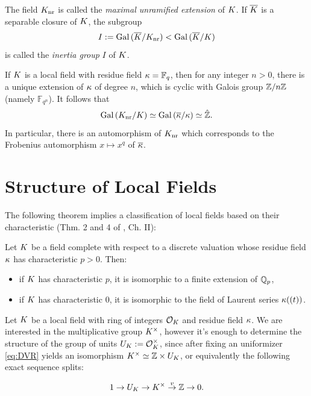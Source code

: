 \documentclass[a4paper, oneside]{memoir}
\begin{document}
The field $K_{\text{nr}}$ is called the \textit{maximal unramified extension} of $K$. If $\overline{K}$ is a separable closure of $K$, the subgroup
\[
    I:=\operatorname{Gal}{(\overline{K}/K_{\text{nr}})} < \operatorname{Gal}{(\overline{K}/K)}
\]
is called the \textit{inertia group} $I$ of $K$.

\begin{example}\label{ex:FinFields}
    If $K$ is a local field with residue field $\kappa=\mathbb{F}_q$, then for any integer $n>0$, there is a unique extension of $\kappa$ of degree $n$, which is cyclic with Galois group $\mathbb{Z}/n\mathbb{Z}$ (namely $\mathbb{F}_{q^n}$). It follows that
    \[
        \operatorname{Gal}{(K_{\text{nr}}/K)}\simeq \operatorname{Gal}{(\overline{\kappa} / \kappa)}\simeq \hat{\mathbb{Z}}.
    \]
    In particular, there is an automorphism of $K_{\text{nr}}$ which corresponds to the Frobenius automorphism $x\mapsto x^q$ of $\overline{\kappa}$.
\end{example}

\section{Structure of Local Fields}

The following theorem implies a classification of local fields based on their characteristic (Thm. 2 and 4 of \cite{SerreCL}, Ch. II):

\begin{theorem}
    Let $K$ be a field complete with respect to a discrete valuation whose residue field $\kappa$ has characteristic $p>0$. Then:
    \begin{itemize}
        \item if $K$ has characteristic $p$, it is isomorphic to a finite extension of $\mathbb{Q}_p$,
        \item if $K$ has characteristic $0$, it is isomorphic to the field of Laurent series $\kappa((t))$.
    \end{itemize}
\end{theorem}

Let $K$ be a local field with ring of integers $\mathcal{O}_K$ and residue field $\kappa$. We are interested in the multiplicative group $K^\times$, however it's enough to determine the structure of the group of units $U_K:=\mathcal{O}_K^\times$, since after fixing an uniformizer \eqref{eq:DVR} yields an isomorphism $K^\times\simeq \mathbb{Z}\times U_K$, or equivalently the following exact sequence splits:

\begin{equation}\label{eq:SplitSeq}
    1\to U_K \to K^\times\overset{v}{\to}\mathbb{Z}\to 0.
\end{equation}
\end{document}
